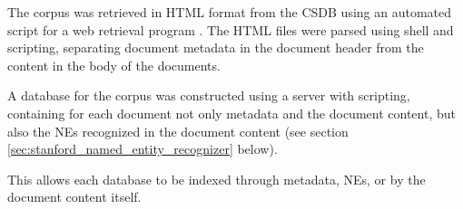The corpus was retrieved in HTML format from the CSDB using an automated script for a web retrieval program \cite{wget}. The HTML files were parsed using shell and \citeauthor{python} scripting, separating document metadata in the document header from the content in the body of the documents.

A database for the corpus was constructed using a \citeauthor{MySQL} server with \citeauthor{perl} scripting, containing for each document not only metadata and the document content, but also the NEs recognized in the document content (see section \ref{sec:stanford_named_entity_recognizer} below).

This allows each database to be indexed through metadata, NEs, or by the document content itself.